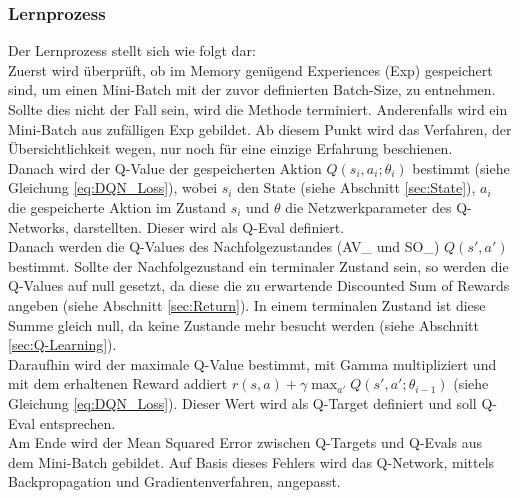 \subsubsection{Lernprozess} \label{sec:Konzept_Lernprozess_DQN}
Der Lernprozess stellt sich wie folgt dar:\\
Zuerst wird überprüft, ob im Memory genügend Experiences (Exp) gespeichert sind, um einen Mini-Batch mit der zuvor definierten Batch-Size, zu entnehmen. Sollte dies nicht der Fall sein, wird die Methode terminiert. Anderenfalls wird ein Mini-Batch aus zufälligen Exp gebildet. Ab diesem Punkt wird das Verfahren, der Übersichtlichkeit wegen, nur noch für eine einzige Erfahrung beschienen.\\
Danach wird der Q-Value der gespeicherten Aktion $Q(s_i,a_i;\theta_i)$ bestimmt (siehe Gleichung \ref{eq:DQN_Loss}), wobei $s_i$ den State (siehe Abschnitt \ref{sec:State}), $a_i$ die gespeicherte Aktion im Zustand $s_i$ und $\theta$ die Netzwerkparameter des Q-Networks, darstellten. Dieser wird als Q-Eval definiert.\\
Danach werden die Q-Values des Nachfolgezustandes (AV\_ und SO\_) $Q(s',a')$ bestimmt. Sollte der Nachfolgezustand ein terminaler Zustand sein, so werden die Q-Values auf null gesetzt, da diese die zu erwartende Discounted Sum of Rewards angeben (siehe Abschnitt \ref{sec:Return}). In einem terminalen Zustand ist diese Summe gleich null, da keine Zustande mehr besucht werden (siehe Abschnitt \ref{sec:Q-Learning}).\\
Daraufhin wird der maximale Q-Value bestimmt, mit Gamma multipliziert und mit dem erhaltenen Reward addiert $r(s,a) + \gamma \max_{a'}Q(s',a';\theta_{i-1})$ (siehe Gleichung \ref{eq:DQN_Loss}). Dieser Wert wird als Q-Target definiert und soll Q-Eval entsprechen.\\
Am Ende wird der Mean Squared Error zwischen Q-Targets und Q-Evals aus dem Mini-Batch gebildet. Auf Basis dieses Fehlers wird das Q-Network, mittels Backpropagation und Gradientenverfahren, angepasst.

